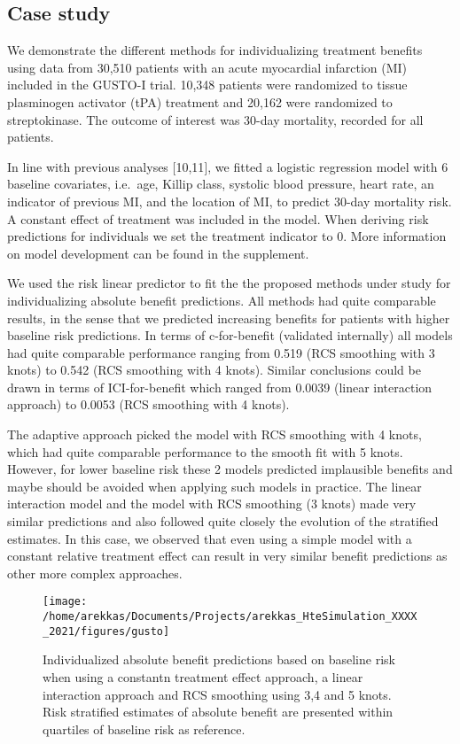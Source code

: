 \documentclass{article}
\begin{document}
\hypertarget{case-study}{%
\subsection{Case study}\label{case-study}}

We demonstrate the different methods for individualizing treatment
benefits using data from 30,510 patients with an acute myocardial
infarction (MI) included in the GUSTO-I trial. 10,348 patients were
randomized to tissue plasminogen activator (tPA) treatment and 20,162
were randomized to streptokinase. The outcome of interest was 30-day
mortality, recorded for all patients.

In line with previous analyses {[}10,11{]}, we fitted a logistic
regression model with 6 baseline covariates, i.e.~age, Killip class,
systolic blood pressure, heart rate, an indicator of previous MI, and
the location of MI, to predict 30-day mortality risk. A constant effect
of treatment was included in the model. When deriving risk predictions
for individuals we set the treatment indicator to 0. More information on
model development can be found in the supplement.

We used the risk linear predictor to fit the the proposed methods under
study for individualizing absolute benefit predictions. All methods had
quite comparable results, in the sense that we predicted increasing
benefits for patients with higher baseline risk predictions. In terms of
c-for-benefit (validated internally) all models had quite comparable
performance ranging from 0.519 (RCS smoothing with 3 knots) to 0.542
(RCS smoothing with 4 knots). Similar conclusions could be drawn in
terms of ICI-for-benefit which ranged from 0.0039 (linear interaction
approach) to 0.0053 (RCS smoothing with 4 knots).

The adaptive approach picked the model with RCS smoothing with 4 knots,
which had quite comparable performance to the smooth fit with 5 knots.
However, for lower baseline risk these 2 models predicted implausible
benefits and maybe should be avoided when applying such models in
practice. The linear interaction model and the model with RCS smoothing
(3 knots) made very similar predictions and also followed quite closely
the evolution of the stratified estimates. In this case, we observed
that even using a simple model with a constant relative treatment effect
can result in very similar benefit predictions as other more complex
approaches.

\begin{figure}
\texttt{[image: /home/arekkas/Documents/Projects/arekkas\_HteSimulation\_XXXX\_2021/figures/gusto]} \caption{Individualized absolute benefit predictions based on baseline risk when using a constantn treatment effect approach, a linear interaction approach and RCS smoothing using 3,4 and 5 knots. Risk stratified estimates of absolute benefit are presented within quartiles of baseline risk as reference.}\label{fig:gusto}
\end{figure}
\end{document}
